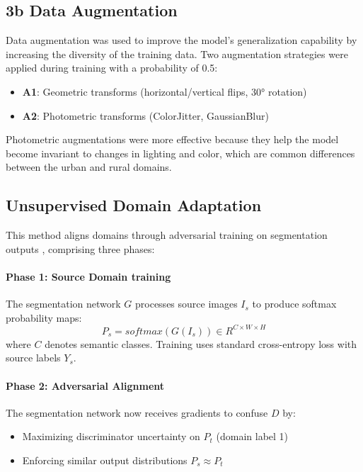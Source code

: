 \documentclass{article}
\begin{document}
\begin{multicols}{2}
		\subsection{3b Data Augmentation}
		Data augmentation was used to improve the model's generalization capability by increasing the diversity of the training data. Two augmentation strategies were applied during training with a probability of 0.5:
		\begin{itemize}
			\item \textbf{A1}: Geometric transforms (horizontal/vertical flips, 30° rotation)
			\item \textbf{A2}: Photometric transforms (ColorJitter, GaussianBlur)
		\end{itemize}
		Photometric augmentations were more effective because they help the model become invariant to changes in lighting and color, which are common differences between the urban and rural domains.
		
\subsection{Unsupervised Domain Adaptation}  
 
This method aligns domains through adversarial training on segmentation outputs \cite{tsai2018learning}, comprising three phases:  

\paragraph{Phase 1: Source Domain training}  
The segmentation network $G$ processes source images $I_s$ to produce softmax probability maps:  
\begin{equation}  
	P_s = {softmax}(G(I_s)) \in {R}^{C \times W \times H}  
\end{equation}  
where $C$ denotes semantic classes. Training uses standard cross-entropy loss with source labels $Y_s$.  



\paragraph{Phase 2: Adversarial Alignment}  
The segmentation network now receives gradients to confuse $D$ by:  
\begin{itemize}  
	\item Maximizing discriminator uncertainty on $P_t$ (domain label 1)
	\item Enforcing similar output distributions $P_s \approx P_t$  


\end{itemize}
\end{multicols}
\end{document}
